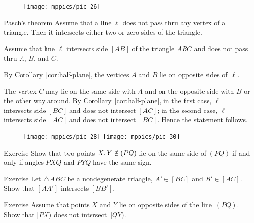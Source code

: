 {

\begin{wrapfigure}{r}{27mm}
\vskip-4mm
\centering
\texttt{[image: mppics/pic-26]}
\end{wrapfigure}

\begin{thm}[\abs]{Pasch's theorem}\label{thm:pasch}
Assume that a line $\ell$ does not pass thru any vertex of a triangle.
Then it intersects either two or zero sides of the triangle.
\end{thm}

Assume that line $\ell$ intersects side $[AB]$ of the triangle $ABC$ and does not pass thru $A$, $B$, and $C$.

By Corollary~\ref{cor:half-plane}, the vertices $A$ and $B$ lie on opposite sides of~$\ell$.

}

The vertex $C$ may lie on the same side with $A$ and on the opposite side with $B$ or the other way around.
By Corollary~\ref{cor:half-plane}, in the first case, $\ell$ intersects side $[BC]$ and does not intersect $[AC]$; in the second case, $\ell$ intersects side $[AC]$ and does not intersect $[BC]$.
Hence the statement follows.
\qeds

{

\begin{wrapfigure}[5]{r}{29mm}
\vskip-4mm
\centering
\texttt{[image: mppics/pic-28]}
\bigskip
\texttt{[image: mppics/pic-30]}
\end{wrapfigure}

\begin{thm}{Exercise}\label{ex:signs-PXQ-PYQ}
Show that two points $X,Y\notin(PQ)$ lie on the same side of $(PQ)$
if and only if angles $PXQ$ and $PYQ$ have the same sign.
\end{thm}

\begin{thm}{Exercise}\label{ex:chevinas}
Let $\triangle ABC$ be a nondegenerate triangle,
$A'\in[BC]$  and 
$B'\in [AC]$.
Show that $[AA']$ intersects $[BB']$.
\end{thm}

\begin{thm}{Exercise}\label{ex:Z}
Assume that points $X$ and $Y$ lie on opposite sides of the line~$(PQ)$.
Show that $[PX)$ does not intersect~$[QY)$. 
\end{thm}

}


